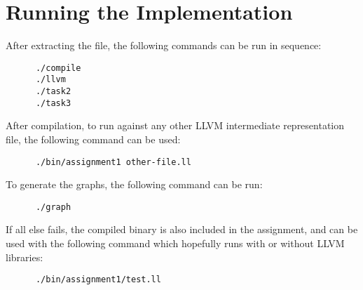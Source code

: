 \documentclass[11pt,a4paper,fleqn]{article}
\begin{document}
\section {Running the Implementation}

After extracting the file, the following commands can be run in sequence:

\begin{verbatim}
      ./compile
      ./llvm
      ./task2
      ./task3
   \end{verbatim}

After compilation, to run against any other LLVM intermediate representation file, the following command can be used:

\begin{verbatim}
      ./bin/assignment1 other-file.ll
   \end{verbatim}

To generate the graphs, the following command can be run:

\begin{verbatim}
      ./graph
   \end{verbatim}

If all else fails, the compiled binary is also included in the assignment, and can be used with the following command which hopefully runs with or without LLVM libraries:

\begin{verbatim}
      ./bin/assignment1/test.ll
   \end{verbatim}
\end{document}
